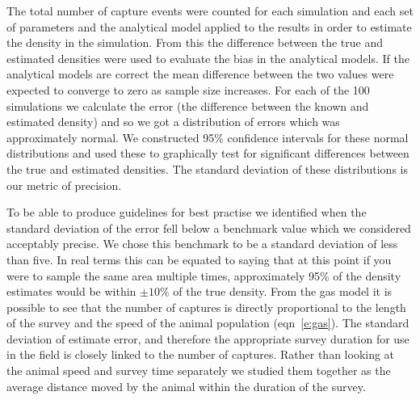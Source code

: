 \documentclass[a4paper,10pt,reqno,oneside]{amsart}
\begin{document}


The total number of capture events were counted for each simulation and each set of parameters and the analytical model applied to the results in order to estimate the density in the simulation. From this the difference between the true and estimated densities were used to evaluate the bias in the analytical models. If the analytical models are correct the mean difference between the two values were expected to converge to zero as sample size increases. For each of the 100 simulations we calculate the error (the difference between the known and estimated density) and so we got a distribution of errors which was approximately normal. We constructed 95\% confidence intervals for these normal distributions and used these to graphically test for significant differences between the true and estimated densities. The standard deviation of these distributions is our metric of precision.

To be able to produce guidelines for best practise we identified when the standard deviation of the error fell below a benchmark value which we considered acceptably precise. We chose this benchmark to be a standard deviation of less than five. In real terms this can be equated to saying that at this point if you were to sample the same area multiple times, approximately 95\% of the density estimates would be within $\pm10\%$ of the true density. From the gas model it is possible to see that the number of captures is directly proportional to the length of the survey and the speed of the animal population (eqn~\ref{e:gas}). The standard deviation of estimate error, and therefore the  appropriate survey duration for use in the field is closely linked to the number of captures. Rather than looking at the animal speed and survey time separately we studied them together as the average distance moved by the animal within the duration of the survey. 


\end{document}
